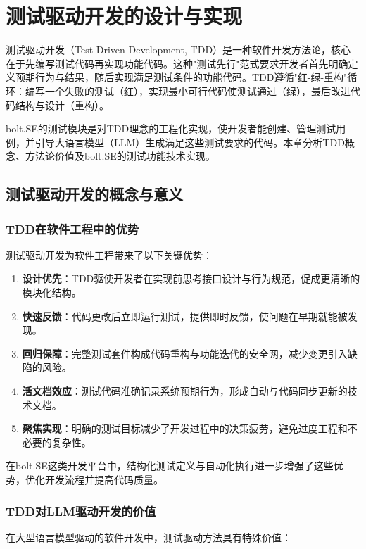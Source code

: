 
\chapter{测试驱动开发的设计与实现}
\label{chap:tdd}

测试驱动开发（Test-Driven Development, TDD）是一种软件开发方法论，核心在于先编写测试代码再实现功能代码。这种"测试先行"范式要求开发者首先明确定义预期行为与结果，随后实现满足测试条件的功能代码。TDD遵循"红-绿-重构"循环：编写一个失败的测试（红），实现最小可行代码使测试通过（绿），最后改进代码结构与设计（重构）。

bolt.SE的测试模块是对TDD理念的工程化实现，使开发者能创建、管理测试用例，并引导大语言模型（LLM）生成满足这些测试要求的代码。本章分析TDD概念、方法论价值及bolt.SE的测试功能技术实现。

\section{测试驱动开发的概念与意义}

\subsection{TDD在软件工程中的优势}
测试驱动开发为软件工程带来了以下关键优势：

\begin{enumerate}
  \item \textbf{设计优先}：TDD驱使开发者在实现前思考接口设计与行为规范，促成更清晰的模块化结构。
  
  \item \textbf{快速反馈}：代码更改后立即运行测试，提供即时反馈，使问题在早期就能被发现。
  
  \item \textbf{回归保障}：完整测试套件构成代码重构与功能迭代的安全网，减少变更引入缺陷的风险。
  
  \item \textbf{活文档效应}：测试代码准确记录系统预期行为，形成自动与代码同步更新的技术文档。
  
  \item \textbf{聚焦实现}：明确的测试目标减少了开发过程中的决策疲劳，避免过度工程和不必要的复杂性。
\end{enumerate}

在bolt.SE这类开发平台中，结构化测试定义与自动化执行进一步增强了这些优势，优化开发流程并提高代码质量。

\subsection{TDD对LLM驱动开发的价值}
在大型语言模型驱动的软件开发中，测试驱动方法具有特殊价值\cite{Mathews2024}：

